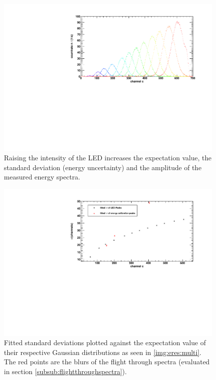 \begin{figure}[H]
\begin{center}
  \includegraphics[width=\textwidth]{../img/energieaufloesung_multi.pdf}
  \caption{Raising the intensity of the LED increases the expectation value, the standard deviation (energy uncertainty) and the amplitude of the
measured energy spectra. }
  \label{img:eres:multi}
\end{center}
\end{figure}


\begin{figure}[H]
\begin{center}
  \includegraphics[width=\textwidth]{../img/energieaufloesung_channels+ecal.pdf}
  \caption{Fitted standard deviations plotted against the expectation value of their respective Gaussian distributions as seen in 
  \autoref{img:eres:multi}. The red points are the blurs of the flight through spectra (evaluated in section \ref{subsub:flightthroughspectra}).}
  \label{img:eres:channels}
\end{center}
\end{figure}

